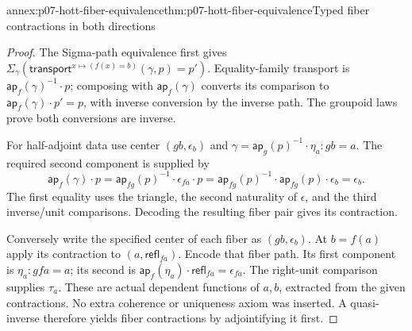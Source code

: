 \begin{annexitem}{annex:p07-hott-fiber-equivalence}{thm:p07-hott-fiber-equivalence}{Typed fiber contractions in both directions}
\begin{proof}
The Sigma-path equivalence first gives
$\Sigma_\gamma(\mathsf{transport}^{x\mapsto(f(x)=b)}(\gamma,p)=p')$.
Equality-family transport is $\mathsf{ap}_f(\gamma)^{-1}\cdot p$;
composing with $\mathsf{ap}_f(\gamma)$ converts its comparison to
$\mathsf{ap}_f(\gamma)\cdot p'=p$, with inverse conversion by the
inverse path. The groupoid laws prove both conversions are inverse.

For half-adjoint data use center $(g b,\epsilon_b)$ and
$\gamma=\mathsf{ap}_g(p)^{-1}\cdot\eta_a:g b=a$.
The required second component is supplied by
\[
 \mathsf{ap}_f(\gamma)\cdot p
 =\mathsf{ap}_{f g}(p)^{-1}\cdot\epsilon_{f a}\cdot p
 =\mathsf{ap}_{f g}(p)^{-1}\cdot\mathsf{ap}_{f g}(p)\cdot\epsilon_b
 =\epsilon_b.
\]
The first equality uses the triangle, the second naturality of
$\epsilon$, and the third inverse/unit comparisons. Decoding the
resulting fiber pair gives its contraction.

Conversely write the specified center of each fiber as $(g b,\epsilon_b)$.
At $b=f(a)$ apply its contraction to $(a,\mathsf{refl}_{f a})$.
Encode that fiber path. Its first component is $\eta_a:g f a=a$;
its second is $\mathsf{ap}_f(\eta_a)\cdot\mathsf{refl}_{f a}=\epsilon_{f a}$.
The right-unit comparison supplies $\tau_a$. These are actual
dependent functions of $a,b$, extracted from the given contractions.
No extra coherence or uniqueness axiom was inserted. A quasi-inverse
therefore yields fiber contractions by adjointifying it first.
\end{proof}
\end{annexitem}


